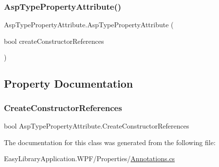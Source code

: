 \subsubsection{\texorpdfstring{Asp\+Type\+Property\+Attribute()}{AspTypePropertyAttribute()}}
{\footnotesize\ttfamily Asp\+Type\+Property\+Attribute.\+Asp\+Type\+Property\+Attribute (\begin{DoxyParamCaption}\item[{bool}]{create\+Constructor\+References }\end{DoxyParamCaption})}



\subsection{Property Documentation}
\mbox{\label{class_asp_type_property_attribute_a57bbcf991d77058648e6292b63726241}} 
\subsubsection{\texorpdfstring{Create\+Constructor\+References}{CreateConstructorReferences}}
{\footnotesize\ttfamily bool Asp\+Type\+Property\+Attribute.\+Create\+Constructor\+References\hspace{0.3cm}{\ttfamily [get]}}



The documentation for this class was generated from the following file\+:\begin{DoxyCompactItemize}
\item 
Easy\+Library\+Application.\+W\+P\+F/\+Properties/\mbox{\hyperlink{_annotations_8cs}{Annotations.\+cs}}\end{DoxyCompactItemize}

